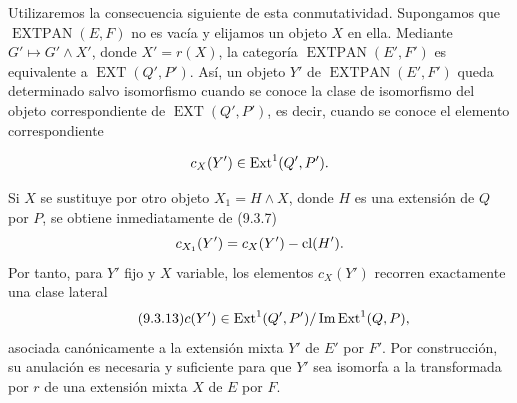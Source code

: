 
\begingroup
\sloppy
Utilizaremos la consecuencia siguiente de esta conmutatividad.
Supongamos que $\operatorname{EXTPAN}(E,F)$ no es vacía y elijamos un
objeto $X$ en ella. Mediante $G'\longmapsto G'\wedge X'$, donde
$X'=r(X)$, la categoría $\operatorname{EXTPAN}(E',F')$ es equivalente
a $\operatorname{EXT}(Q',P')$. Así, un objeto $Y'$ de
$\operatorname{EXTPAN}(E',F')$ queda determinado salvo isomorfismo
cuando se conoce la clase de isomorfismo del objeto correspondiente de
$\operatorname{EXT}(Q',P')$, es decir, cuando se conoce el elemento
correspondiente
\par
\endgroup
\begin{equation*}
 c_X(Y')\in\Ext^1(Q',P').
\end{equation*}

Si $X$ se sustituye por otro objeto $X_1=H\wedge X$, donde $H$ es una
extensión de $Q$ por $P$, se obtiene inmediatamente de (9.3.7)
\begin{equation*}
 c_{X_1}(Y')=c_X(\sisi{Y}{Y'})-\operatorname{cl}(H').
\end{equation*}
Por tanto, para $Y'$ fijo y $X$ variable, los elementos $c_X(Y')$
recorren exactamente una clase lateral
\begin{equation}\tag{9.3.13}
 c(Y')\in
 \Ext^1(Q',P')/\operatorname{Im}\Ext^1(Q,P),
\end{equation}
asociada canónicamente a la extensión mixta $Y'$ de $E'$ por $F'$. Por
construcción, su anulación es necesaria y suficiente para que $Y'$ sea
isomorfa a la transformada por $r$ de una extensión mixta $X$ de $E$
por $F$.
